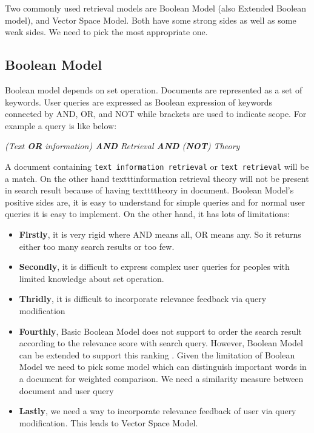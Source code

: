 \label{sec:approach}

Two commonly used retrieval models are Boolean Model (also Extended Boolean model), and
Vector Space Model. Both have some strong sides as well as some weak sides. We need to pick
the most appropriate one.

\subsection{Boolean Model}
\label{sec:boolean}
Boolean model \cite{info-retr-online} depends on set operation. Documents are represented as a set of keywords.
User queries are expressed as Boolean expression of keywords connected by AND, OR, and
NOT while brackets are used to indicate scope. For example a query is like below:

\textit{(Text \textbf{OR} information) \textbf{AND} Retrieval \textbf{AND} (\textbf{NOT}) Theory}

A document containing \texttt{text information retrieval} or \texttt{text retrieval} will be a match. On the
other hand texttt{information retrieval theory} will not be present in search result because of having
texttt{theory} in document. Boolean Model's positive sides are, it is easy to understand for simple
queries and for normal user queries it is easy to implement. On the other hand, it has lots of
limitations:
\begin{itemize}
\item \textbf{Firstly},  it is very rigid where AND means all, OR means any. So it returns either too many search results or too few.
\item \textbf{Secondly}, it is difficult to express complex user queries for peoples
with limited knowledge about set operation.
\item \textbf{Thridly},  it is difficult to incorporate relevance feedback via query modification
\item \textbf{Fourthly}, Basic Boolean Model does not support to order the search result according to the relevance score with search query. However, Boolean Model can be extended to support this ranking \cite{ext-boolean}. Given the limitation of Boolean Model we need to pick some model which can distinguish important words in a document for weighted comparison. We need a similarity measure between document and user query
\item \textbf{Lastly}, we need a way to incorporate relevance feedback of user via
query modification. This leads to Vector Space Model.
\end{itemize}

